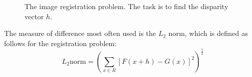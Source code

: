 \documentclass[11pt,a4paper]{report}
\begin{document}
\begin{figure}[H] 
\centering
\setlength\fboxsep{0.5pt}
\setlength\fboxrule{0.5pt}
\caption{ The image registration problem. The task is to find the disparity
  vector $h$.}
\end{figure}

The measure of difference most often used is the $L_2$ norm, which is defined
as follows for the registration problem:
\begin{equation}
L_2 \mathrm{norm} = (\sum_{x \in R} [F(x + h) - G(x)]^2)^{\frac{1}{2}}
\end{equation}
\end{document}
